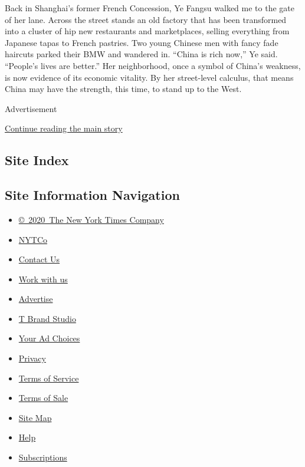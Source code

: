 Back in Shanghai's former French Concession, Ye Fangsu walked me to the
gate of her lane. Across the street stands an old factory that has been
transformed into a cluster of hip new restaurants and marketplaces,
selling everything from Japanese tapas to French pastries. Two young
Chinese men with fancy fade haircuts parked their BMW and wandered in.
``China is rich now,'' Ye said. ``People's lives are better.'' Her
neighborhood, once a symbol of China's weakness, is now evidence of its
economic vitality. By her street-level calculus, that means China may
have the strength, this time, to stand up to the West.

Advertisement

\protect\hyperlink{after-bottom}{Continue reading the main story}

\hypertarget{site-index}{%
\subsection{Site Index}\label{site-index}}

\hypertarget{site-information-navigation}{%
\subsection{Site Information
Navigation}\label{site-information-navigation}}

\begin{itemize}
\tightlist
\item
  \href{https://help.nytimes3xbfgragh.onion/hc/en-us/articles/115014792127-Copyright-notice}{©~2020~The
  New York Times Company}
\end{itemize}

\begin{itemize}
\tightlist
\item
  \href{https://www.nytco.com/}{NYTCo}
\item
  \href{https://help.nytimes3xbfgragh.onion/hc/en-us/articles/115015385887-Contact-Us}{Contact
  Us}
\item
  \href{https://www.nytco.com/careers/}{Work with us}
\item
  \href{https://nytmediakit.com/}{Advertise}
\item
  \href{http://www.tbrandstudio.com/}{T Brand Studio}
\item
  \href{https://www.nytimes3xbfgragh.onion/privacy/cookie-policy\#how-do-i-manage-trackers}{Your
  Ad Choices}
\item
  \href{https://www.nytimes3xbfgragh.onion/privacy}{Privacy}
\item
  \href{https://help.nytimes3xbfgragh.onion/hc/en-us/articles/115014893428-Terms-of-service}{Terms
  of Service}
\item
  \href{https://help.nytimes3xbfgragh.onion/hc/en-us/articles/115014893968-Terms-of-sale}{Terms
  of Sale}
\item
  \href{https://spiderbites.nytimes3xbfgragh.onion}{Site Map}
\item
  \href{https://help.nytimes3xbfgragh.onion/hc/en-us}{Help}
\item
  \href{https://www.nytimes3xbfgragh.onion/subscription?campaignId=37WXW}{Subscriptions}
\end{itemize}
